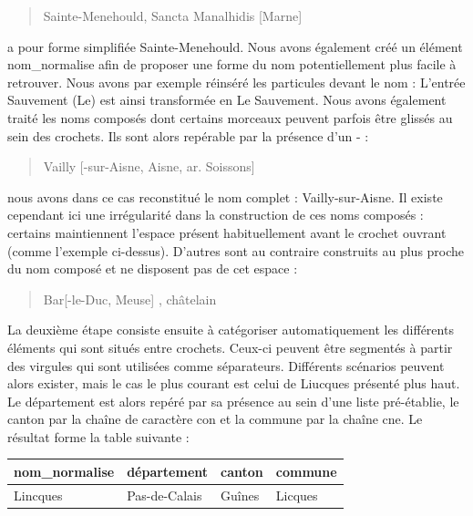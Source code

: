 \documentclass[a4paper,12pt,twoside]{book}
\begin{document}
	\begin{quotation}
		Sainte-Menehould, Sancta Manalhidis [Marne]
	\end{quotation}

	\noindent a pour forme simplifiée \og Sainte-Menehould\fg{}. Nous avons également créé un élément \og nom\_normalise\fg{} afin de proposer une forme du nom potentiellement plus facile à retrouver. Nous avons par exemple réinséré les particules devant le nom : L'entrée \og Sauvement (Le)\fg{} est ainsi transformée en \og Le Sauvement\fg{}. Nous avons également traité les noms composés dont certains morceaux peuvent parfois être glissés au sein des crochets. Ils sont alors repérable par la présence d'un \og - \fg{} : 
	
	\begin{quotation}
		Vailly [-sur-Aisne, Aisne, ar. Soissons]
	\end{quotation}
	
	\noindent nous avons dans ce cas reconstitué le nom complet : \og Vailly-sur-Aisne\fg{}. Il existe cependant ici une irrégularité dans la construction de ces noms composés : certains maintiennent l'espace présent habituellement avant le crochet ouvrant (comme l'exemple ci-dessus). D'autres sont au contraire construits au plus proche du nom composé et ne disposent pas de cet espace :
	
	\begin{quotation}
		Bar[-le-Duc, Meuse] , châtelain
	\end{quotation}
	
	La deuxième étape consiste ensuite à catégoriser automatiquement les différents éléments qui sont situés entre crochets. Ceux-ci peuvent être segmentés à partir des virgules qui sont utilisées comme séparateurs. Différents scénarios peuvent alors exister, mais le cas le plus courant est celui de \og Liucques\fg{} présenté plus haut. Le département est alors repéré par sa présence au sein d'une liste pré-établie, le canton par la chaîne de caractère \og con\fg{} et la commune par la chaîne \og cne\fg{}. Le résultat forme la table suivante :
	
	\begin{center}
		\begin{tabular}{|p{3cm}|p{3cm}|p{3cm}|p{3cm}|}
			\hline
			nom\_normalise & département & canton & commune \\ \hline
			Lincques & Pas-de-Calais & Guînes & Licques \\ \hline
		\end{tabular}
	\end{center}
	
\end{document}
